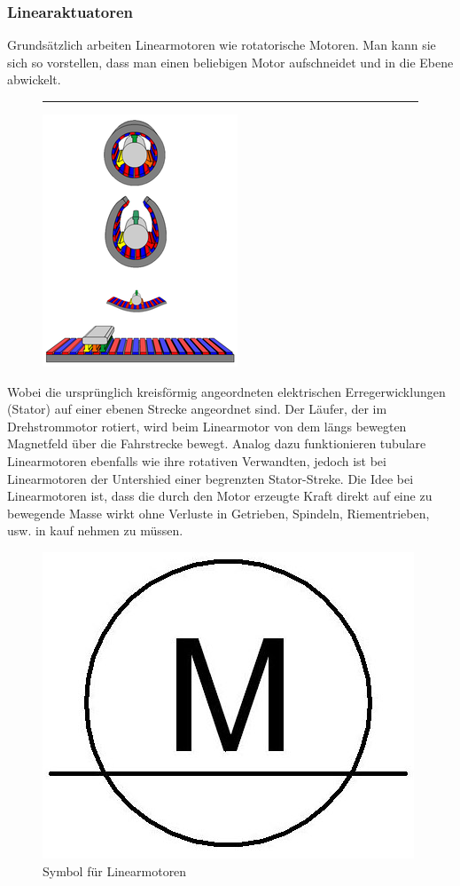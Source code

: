 			\newpage	
			\subsubsection{Linearaktuatoren}				
				\begin{description}[leftmargin=2.5cm]
					\item[Allgemein]					
					Grundsätzlich arbeiten Linearmotoren wie rotatorische Motoren. Man kann sie sich so vorstellen, dass man einen beliebigen Motor aufschneidet und in die Ebene abwickelt.
					\leavevmode \\
					\begin{figure}[h!]
						\centering \rule{1.5cm}{0cm}
						\includegraphics[width=0.2\linewidth]{./pics/el/rot2lin} 
					\end{figure} 
					Wobei die ursprünglich kreisförmig angeordneten elektrischen Erregerwicklungen (Stator) auf einer ebenen Strecke angeordnet sind. Der Läufer, der im Drehstrommotor rotiert, wird beim Linearmotor von dem längs bewegten Magnetfeld über die Fahrstrecke bewegt. Analog dazu funktionieren tubulare Linearmotoren ebenfalls wie ihre rotativen Verwandten, jedoch ist bei Linearmotoren der Untershied einer begrenzten Stator-Streke. Die Idee bei Linearmotoren ist, dass die durch den Motor erzeugte Kraft direkt auf eine zu bewegende Masse wirkt ohne Verluste in Getrieben, Spindeln, Riementrieben, usw. in kauf nehmen zu müssen.
					\begin{figure}[h!]
						\centering 
						\includegraphics[width=0.05\linewidth]{./pics/el/symbolLinearmotor}
						\caption{Symbol für Linearmotoren}
					\end{figure} \leavevmode \\


\end{description}
